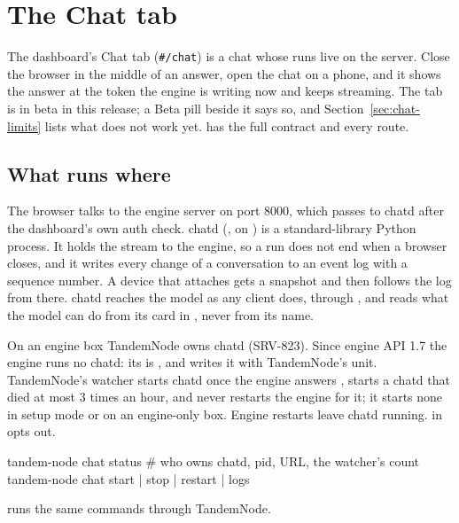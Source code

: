 \chapter{The Chat tab}\label{ch:chat}

The dashboard's Chat tab (\texttt{\#/chat}) is a chat whose runs live on the server. Close the browser in the middle of an answer, open the chat on a phone, and it shows the answer at the token the engine is writing now and keeps streaming. The tab is in beta in this release; a Beta pill beside it says so, and Section~\ref{sec:chat-limits} lists what does not work yet.  has the full contract and every route.

\section{What runs where}

The browser talks to the engine server on port 8000, which passes  to chatd after the dashboard's own auth check. chatd (, on ) is a standard-library Python process. It holds the stream to the engine, so a run does not end when a browser closes, and it writes every change of a conversation to an event log with a sequence number. A device that attaches gets a snapshot and then follows the log from there. chatd reaches the model as any client does, through , and reads what the model can do from its card in , never from its name.

On an engine box TandemNode owns chatd (SRV-823). Since engine API 1.7 the engine runs no chatd: its  is , and  writes it with TandemNode's unit. TandemNode's watcher starts chatd once the engine answers , starts a chatd that died at most 3 times an hour, and never restarts the engine for it; it starts none in setup mode or on an engine-only box. Engine restarts leave chatd running.  in  opts out.

\begin{shell}
tandem-node chat status            # who owns chatd, pid, URL, the watcher's count
tandem-node chat start | stop | restart | logs
\end{shell}

 runs the same commands through TandemNode.

